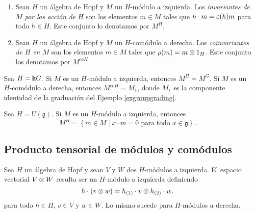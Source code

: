 \documentclass[a4paper,oneside,fleqn,11pt,../tesis.tex]{subfiles}
\begin{document}
\begin{definition}
	\begin{enumerate}[(1)]
		\item
		Sean $H$ un álgebra de Hopf y $M$ un $H$-módulo a izquierda. Los \emph{invariantes de $M$ por las acción de $H$} son los elementos $m \in M$
		tales que $h \cdot m = \varepsilon(h)m$ para todo $h \in H$. Este conjunto lo denotamos por $M^{H}$.
		\item
		Sean $H$ un álgebra de Hopf y $M$ un $H$-comódulo a derecha. Los \emph{coinvariantes de $H$ en $M$} son los elementos $m \in M$
		tales que $\rho(m) = m \otimes 1_{H}$. Este conjunto los denotamos por $M^{coH}$
	\end{enumerate}
\end{definition}

\begin{example}
	Sea $H = \Bbbk G$. Si $M$ es un $H$-módulo a izquierda, entonces $M^{H} = M^{G}$. Si $M$ es un $H$-comódulo a derecha, entonces
	$M^{coH} = M_1$, donde $M_1$ es la componente identidad de la graduación del Ejemplo \ref{exgroupgrading}. 
\end{example}

\begin{example}
	Sea $H = U(\mathfrak{g})$. Si $M$ es un $H$-módulo a izquierda, entonces
	\[
		M^{H} = \left\lbrace m \in M \mid x \cdot m = 0 \text{ para todo } x \in \mathfrak{g} \right\rbrace.
	\]
\end{example}

\subsection{Producto tensorial de módulos y comódulos}

Sea $H$ un álgebra de Hopf y sean $V$ y $W$ dos $H$-módulos a izquierda. El espacio vectorial $V \otimes W$ resulta ser un $H$-módulo a izquierda definiendo
\[
	h \cdot (v \otimes w) = h_{(1)} \cdot v \otimes h_{(2)} \cdot w.	
\]
para todo $h \in H$, $v \in V$ y $w \in W$. Lo mismo sucede para $H$-módulos a derecha.
	
\end{document}
